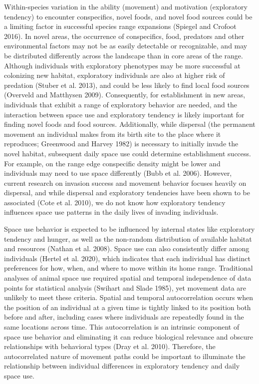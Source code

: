 \documentclass[
]{article}
\begin{document}
Within-species variation in the ability (movement) and motivation
(exploratory tendency) to encounter conspecifics, novel foods, and novel
food sources could be a limiting factor in successful species range
expansions (Spiegel and Crofoot 2016). In novel areas, the occurrence of
conspecifics, food, predators and other environmental factors may not be
as easily detectable or recognizable, and may be distributed differently
across the landscape than in core areas of the range. Although
individuals with exploratory phenotypes may be more successful at
colonizing new habitat, exploratory individuals are also at higher risk
of predation (Stuber et al. 2013), and could be less likely to find
local food sources (Overveld and Matthysen 2009). Consequently, for
establishment in new areas, individuals that exhibit a range of
exploratory behavior are needed, and the interaction between space use
and exploratory tendency is likely important for finding novel foods and
food sources. Additionally, while dispersal (the permanent movement an
individual makes from its birth site to the place where it reproduces;
Greenwood and Harvey 1982) is necessary to initially invade the novel
habitat, subsequent daily space use could determine establishment
success. For example, on the range edge conspecific density might be
lower and individuals may need to use space differently (Bubb et al.
2006). However, current research on invasion success and movement
behavior focuses heavily on dispersal, and while dispersal and
exploratory tendencies have been shown to be associated (Cote et al.
2010), we do not know how exploratory tendency influences space use
patterns in the daily lives of invading individuals.

Space use behavior is expected to be influenced by internal states like
exploratory tendency and hunger, as well as the non-random distribution
of available habitat and resources (Nathan et al. 2008). Space use can
also consistently differ among individuals (Hertel et al. 2020), which
indicates that each individual has distinct preferences for how, when,
and where to move within its home range. Traditional analyses of animal
space use required spatial and temporal independence of data points for
statistical analysis (Swihart and Slade 1985), yet movement data are
unlikely to meet these criteria. Spatial and temporal autocorrelation
occurs when the position of an individual at a given time is tightly
linked to its position both before and after, including cases where
individuals are repeatedly found in the same locations across time. This
autocorrelation is an intrinsic component of space use behavior and
eliminating it can reduce biological relevance and obscure relationships
with behavioral types (Dray et al. 2010). Therefore, the autocorrelated
nature of movement paths could be important to illuminate the
relationship between individual differences in exploratory tendency and
daily space use.
\end{document}
